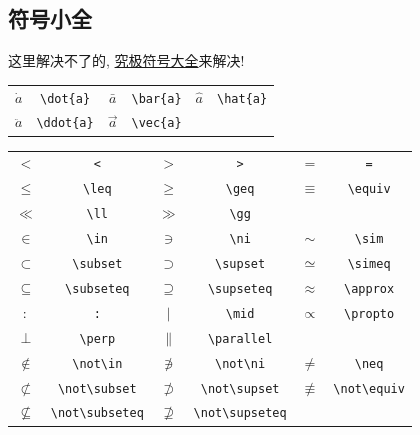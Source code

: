\documentclass{ctexart}
\begin{document}
    \subsection{符号小全}
    这里解决不了的, \href{
        https://www.ctan.org/tex-archive/info/symbols/comprehensive
    }{究极符号大全}来解决!
    \begin{table}[!htbp]
        \centering
        \begin{tabular}{cccccc}
            $\dot{a}$ & \verb|\dot{a}| &
            $\bar{a}$ & \verb|\bar{a}| &
            $\hat{a}$ & \verb|\hat{a}| \\
            $\ddot{a}$ & \verb|\ddot{a}| &
            $\vec{a}$ & \verb|\vec{a}| \\
        \end{tabular}
    \end{table}
    \begin{table}[!htbp]
        \centering
        \begin{tabular}{cccccc}
            $<$ & \verb|<| &
            $>$ & \verb|>| &
            $=$ & \verb|=| \\
            $\leq$ & \verb|\leq| &
            $\geq$ & \verb|\geq| &
            $\equiv$ & \verb|\equiv| \\
            $\ll$ & \verb|\ll| &
            $\gg$ & \verb|\gg| \\
            $\in$ & \verb|\in| &
            $\ni$ & \verb|\ni| &
            $\sim$ & \verb|\sim| \\
            $\subset$ & \verb|\subset| &
            $\supset$ & \verb|\supset| &
            $\simeq$ & \verb|\simeq| \\
            $\subseteq$ & \verb|\subseteq| &
            $\supseteq$ & \verb|\supseteq| &
            $\approx$ & \verb|\approx| \\
            $:$ & \verb|:| &
            $\mid$ & \verb|\mid| &
            $\propto$ & \verb|\propto| \\
            $\perp$ & \verb|\perp| &
            $\parallel$ & \verb|\parallel| \\
            $\not\in$ & \verb|\not\in| &
            $\not\ni$ & \verb|\not\ni| &
            $\neq$ & \verb|\neq| \\
            $\not\subset$ & \verb|\not\subset| &
            $\not\supset$ & \verb|\not\supset| &
            $\not\equiv$ & \verb|\not\equiv| \\
            $\not\subseteq$ & \verb|\not\subseteq| &
            $\not\supseteq$ & \verb|\not\supseteq| \\
        \end{tabular}
    \end{table}
\end{document}
